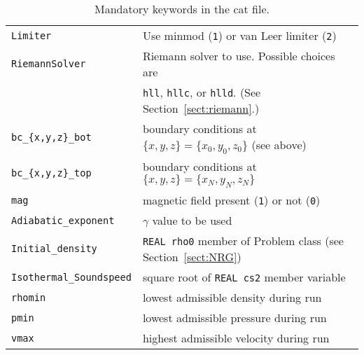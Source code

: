 \begin{table}
\begin{tabular}{|ll|}
  {\tt Limiter} & Use minmod ({\tt 1}) or van Leer limiter ({\tt 2}) \\
  {\tt RiemannSolver} & Riemann solver to use. Possible choices are\\
  & {\tt hll}, {\tt hllc}, or {\tt hlld}. (See Section~\ref{sect:riemann}.) \\
  {\tt bc\_\{x,y,z\}\_bot} & boundary conditions at
  $\{x,y,z\}=\{x_0,y_0,z_0\}$ (see above)\\
  {\tt bc\_\{x,y,z\}\_top} & boundary conditions at
  $\{x,y,z\}=\{x_N,y_N,z_N\}$ \\
  {\tt mag} & magnetic field present ({\tt 1}) or not ({\tt 0}) \\
  {\tt Adiabatic\_exponent} & $\gamma$ value to be used \\
  {\tt Initial\_density} & {\tt REAL rho0} member of Problem class
  (see Section~\ref{sect:NRG})\\
  {\tt Isothermal\_Soundspeed} & square root of {\tt REAL cs2}
  member variable \\
  {\tt rhomin} & lowest admissible density during run \\
  {\tt pmin}   & lowest admissible pressure during run \\
  {\tt vmax}   & highest admissible velocity during run \\
  \hline
\end{tabular}
\caption{\label{tab:keywords} Mandatory keywords in the cat file.}
\end{table}


